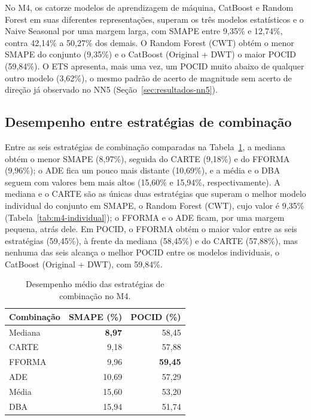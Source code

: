 No M4, os catorze modelos de aprendizagem de máquina, CatBoost e Random Forest em suas diferentes representações, superam os três modelos estatísticos e o Naive Seasonal por uma margem larga, com SMAPE entre 9,35\% e 12,74\%, contra 42,14\% a 50,27\% dos demais. O Random Forest (CWT) obtém o menor SMAPE do conjunto (9,35\%) e o CatBoost (Original + DWT) o maior POCID (59,84\%). O ETS apresenta, mais uma vez, um POCID muito abaixo de qualquer outro modelo (3,62\%), o mesmo padrão de acerto de magnitude sem acerto de direção já observado no NN5 (Seção~\ref{sec:resultados-nn5}).

\subsection{Desempenho entre estratégias de combinação}

Entre as seis estratégias de combinação comparadas na Tabela~\ref{tab:m4-estaticas}, a mediana obtém o menor SMAPE (8,97\%), seguida do CARTE (9,18\%) e do FFORMA (9,96\%); o ADE fica um pouco mais distante (10,69\%), e a média e o DBA seguem com valores bem mais altos (15,60\% e 15,94\%, respectivamente). A mediana e o CARTE são as únicas duas estratégias que superam o melhor modelo individual do conjunto em SMAPE, o Random Forest (CWT), cujo valor é 9,35\% (Tabela~\ref{tab:m4-individual}); o FFORMA e o ADE ficam, por uma margem pequena, atrás dele. Em POCID, o FFORMA obtém o maior valor entre as seis estratégias (59,45\%), à frente da mediana (58,45\%) e do CARTE (57,88\%), mas nenhuma das seis alcança o melhor POCID entre os modelos individuais, o CatBoost (Original + DWT), com 59,84\%.

\begin{table}[H]
\small
\centering
\caption{Desempenho médio das estratégias de combinação no M4.}
\label{tab:m4-estaticas}
\begin{tabular}{@{}lrr@{}}
\toprule
\textbf{Combinação} & \textbf{SMAPE (\%)} & \textbf{POCID (\%)} \\
\midrule
Mediana & \textbf{8,97} & 58,45 \\
CARTE   & 9,18 & 57,88 \\
FFORMA  & 9,96 & \textbf{59,45} \\
ADE     & 10,69 & 57,29 \\
Média   & 15,60 & 53,20 \\
DBA     & 15,94 & 51,74 \\
\bottomrule
\end{tabular}
\end{table}

